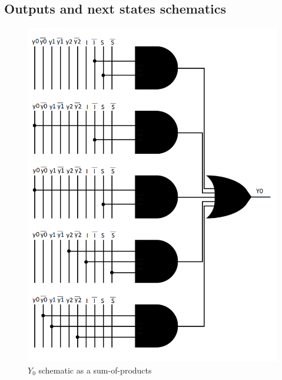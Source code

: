 \documentclass[../../e3_tp3_main.tex]{subfiles}
\begin{document}
\subsection{Outputs and next states schematics}
\begin{figure}[H]
	\centering
	\includegraphics{figures/moore_Y0_schem.PNG}
	\caption{$Y_0$ schematic as a sum-of-products}
	\label{fig:ej1_moore_Y0_schem}
\end{figure}
\end{document}
